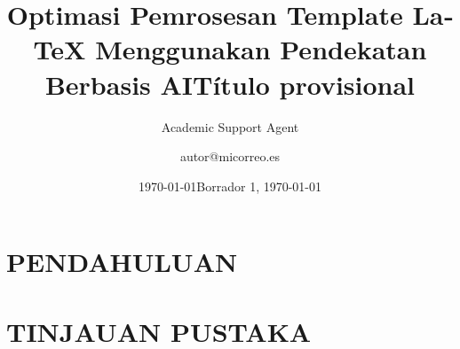\documentclass{article}
\title{Optimasi Pemrosesan Template LaTeX Menggunakan Pendekatan Berbasis AI}
\author{Academic Support Agent}
\date{\today}
\begin{document}
\maketitle

\begin{abstract}

\end{abstract}

\chapter{PENDAHULUAN}


\chapter{TINJAUAN PUSTAKA}


\usepackage{polyglossia}
\setmainlanguage{spanish}
\usepackage{hyperref}
\usepackage{fullpage}
\usepackage{amssymb}
\usepackage{xspace}
\usepackage{graphicx}
\usepackage{longtable}
\usepackage[dvipsnames]{xcolor}
\usepackage{savetrees}
\usepackage{lipsum}
\newcommand{\prog}[1]{\texttt{#1}\xspace}

\title{Título provisional}
\author{autor@micorreo.es}
\date{Borrador 1, \today}
\end{document}

